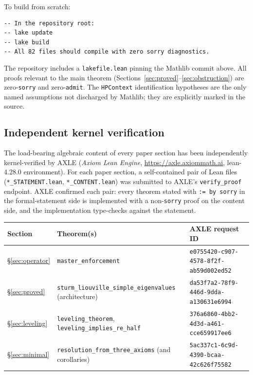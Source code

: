 \documentclass[12pt, a4paper]{article}
\theoremstyle{plain}
\theoremstyle{definition}
\newcommand{\lean}[1]{\texttt{#1}}
\newcommand{\Mathlib}{\textsf{Mathlib}}
\begin{document}
To build from scratch:
\begin{lstlisting}[language=Lean4]
-- In the repository root:
-- lake update
-- lake build
-- All 82 files should compile with zero sorry diagnostics.
\end{lstlisting}

The repository includes a \texttt{lakefile.lean} pinning the Mathlib commit above.
All proofs relevant to the main theorem (Sections~\ref{sec:proved}--\ref{sec:obstruction})
are zero-\lean{sorry} and zero-\lean{admit}.
The \lean{HPContext} identification hypotheses are the only named assumptions not
discharged by \Mathlib{}; they are explicitly marked in the source.

\subsection*{Independent kernel verification}
\label{sec:axle}

The load-bearing algebraic content of every paper section has been
independently kernel-verified by AXLE (\emph{Axiom Lean Engine},
\url{https://axle.axiommath.ai}, lean-4.28.0 environment).
For each paper section, a self-contained pair of Lean files
(\texttt{*\_STATEMENT.lean}, \texttt{*\_CONTENT.lean}) was submitted to
AXLE's \texttt{verify\_proof} endpoint.
AXLE confirmed each pair: every theorem stated with \lean{:= by sorry}
in the formal-statement side is implemented with a non-\lean{sorry}
proof on the content side, and the implementation type-checks against
the statement.

\begin{center}
\renewcommand{\arraystretch}{1.3}
\footnotesize
\begin{tabular}{lll}
  \toprule
  \textbf{Section} & \textbf{Theorem(s)} & \textbf{AXLE request ID} \\
  \midrule
  \S\ref{sec:operator} & \lean{master\_enforcement} & \texttt{e0755420-c907-4578-8f2f-ab59d002ed52} \\
  \S\ref{sec:proved}   & \lean{sturm\_liouville\_simple\_eigenvalues} (architecture) & \texttt{da53f7a2-78f9-446d-9dda-a130631e6994} \\
  \S\ref{sec:leveling} & \lean{leveling\_theorem}, \lean{leveling\_implies\_re\_half} & \texttt{376a6860-4bb2-4d3d-a461-cce659917ee6} \\
  \S\ref{sec:minimal}  & \lean{resolution\_from\_three\_axioms} (and corollaries) & \texttt{5ac337c1-6c9d-4390-bcaa-42c626f75582} \\
  \bottomrule
\end{tabular}
\end{center}
\end{document}
